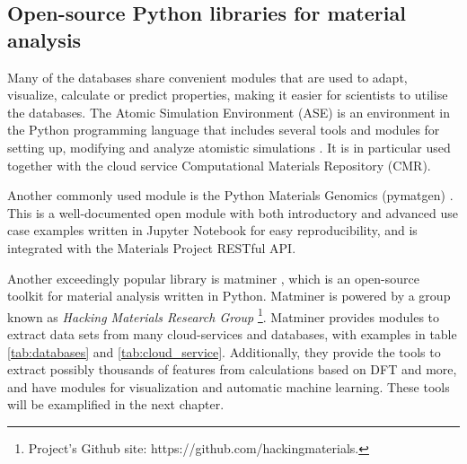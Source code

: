 \begin{table}[!ht]
\centering
\noindent{}
\caption{A selection of cloud services that offers database-storage. Abbreviations used are Computational Materials Repository (CMR), NIMS Materials Database (MatNavi), PRedictive Integrated Structural Materials Science (PRISMS), Materials Platform for Data Science (MPDS) and the Materials Data Fascility (MDF).}
\label{tab:cloud_service}
\end{table}

\subsection{Open-source Python libraries for material analysis}
Many of the databases share convenient modules that are used to adapt, visualize, calculate or predict properties, making it easier for scientists to utilise the databases.
The Atomic Simulation Environment (ASE) is an environment in the Python programming language that includes several tools and modules for setting up, modifying and analyze atomistic simulations \cite{Larsen2017}. It is in particular used together with the cloud service Computational Materials Repository (CMR).

Another commonly used module is the Python Materials Genomics (pymatgen) \cite{Ong2013}. This is a well-documented open module with both introductory and advanced use case examples written in Jupyter Notebook for easy reproducibility, and is integrated with the Materials Project RESTful API.

Another exceedingly popular library is matminer \cite{Ward2018}, which is an open-source toolkit for material analysis written in Python. Matminer is powered by a group known as \textit{Hacking Materials Research Group} \footnote{Project's Github site: https://github.com/hackingmaterials.}. Matminer provides modules to extract data sets from many cloud-services and databases, with examples in table \ref{tab:databases} and \ref{tab:cloud_service}. Additionally, they provide the tools to extract possibly thousands of features from calculations based on DFT and more, and have modules for visualization and automatic machine learning. These tools will be examplified in the next chapter.

